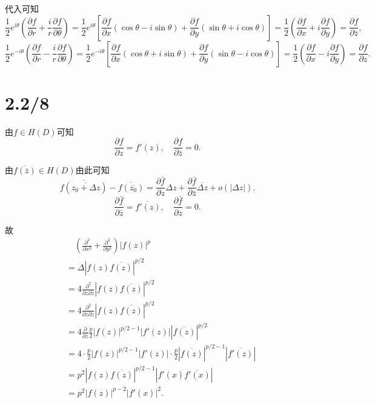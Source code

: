 \documentclass[11pt,a4paper]{article}
\begin{document}
代入可知
$$\frac{1}{2}e^{i\theta}\left(\frac{\partial f}{\partial r}+\frac{i}{r}\frac{\partial f}{\partial\theta}\right)=
  \frac{1}{2}e^{i\theta}\left[\frac{\partial f}{\partial x}(\cos\theta-i\sin\theta)+\frac{\partial f}{\partial y}(\sin\theta+i\cos\theta)\right]=
  \frac{1}{2}\left(\frac{\partial f}{\partial x}+i\frac{\partial f}{\partial y}\right)=\frac{\partial f}{\partial\bar{z}},$$
$$\frac{1}{2}e^{-i\theta}\left(\frac{\partial f}{\partial r}-\frac{i}{r}\frac{\partial f}{\partial\theta}\right)=
  \frac{1}{2}e^{-i\theta}\left[\frac{\partial f}{\partial x}(\cos\theta+i\sin\theta)+\frac{\partial f}{\partial y}(\sin\theta-i\cos\theta)\right]=
  \frac{1}{2}\left(\frac{\partial f}{\partial x}-i\frac{\partial f}{\partial y}\right)=\frac{\partial f}{\partial z}.$$



\section{2.2/8}

由$f\in H(D)$可知
$$\frac{\partial f}{\partial z}=f'(z),\quad \frac{\partial f}{\partial\bar{z}}=0.$$

由$\overline{f(\bar{z})}\in H(D)$由此可知
$$\overline{f(\overline{z_0+\Delta z})}-\overline{f(\overline{z_0})}=\frac{\partial\bar{f}}{\partial z}\Delta z+ \frac{\partial\bar{f}}{\partial\bar{z}}\overline{\Delta z}+o(|\Delta z|).$$
$$\frac{\partial\bar{f}}{\partial\bar{z}}=\overline{f'(z)},\quad\frac{\partial\bar{f}}{\partial z}=0.$$

故
\begin{align*}
   & \quad \left(\frac{\partial^2}{\partial x^2}+\frac{\partial^2}{\partial y^2}\right)|f(z)|^p          \\
   & = \Delta|f(z)\overline{f(z)}|^{p/2}                                                                 \\
   & =4\frac{\partial^2}{\partial z\partial\bar{z}}|f(z)\overline{f(z)}|^{p/2}                           \\
   & =4\frac{\partial^2}{\partial z\partial\bar{z}}|f(z)\overline{f(z)}|^{p/2}                           \\
   & = 4\frac{\partial}{\partial\bar{z}}\frac{p}{2}|f(z)|^{p/2-1}|f'(z)||\overline{f(z)}|^{p/2}          \\
   & = 4\cdot\frac{p}{2}|f(z)|^{p/2-1}|f'(z)|\cdot\frac{p}{2}|\overline{f(z)}|^{p/2-1}|\overline{f'(z)}| \\
   & =p^2|f(z)\overline{f(z)}|^{p/2-1}|f'(x)\overline{f'(x)}|                                            \\
   & = p^2|f(z)|^{p-2}|f'(x)|^2.
\end{align*}
\end{document}
